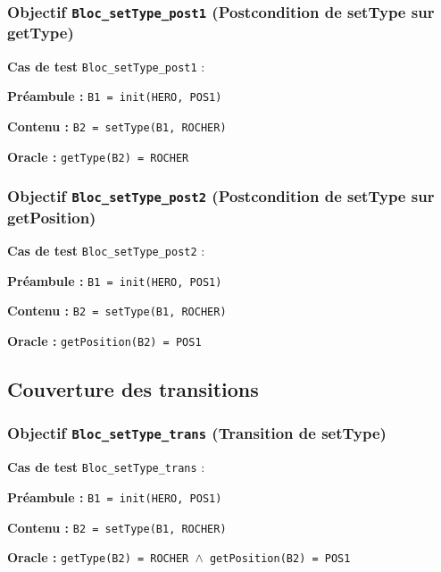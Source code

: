 \documentclass{article}
\newcommand{\cmd}[1]{\texttt{#1}}
\newcommand{\lAND}{$\land$}
\newcommand{\obj}[2]{\subsubsection*{\large{\textbf{Objectif {\cmd{#1} (#2)}}}}}
\newenvironment{cas}[1]
{
	\hspace{1em}\textbf{Cas de test} \cmd{#1} :
	\begin{list}{}{}
}{
	\end{list}
}
\newcommand{\pre}[1]{\item \textbf{Préambule :} \cmd{#1}}
\newcommand{\ope}[1]{\item \textbf{Contenu :} \cmd{#1}}
\newcommand{\ora}[1]{\item \textbf{Oracle :} \cmd{#1}}
\begin{document}
\obj{Bloc\_setType\_post1} {Postcondition de setType sur getType}
	\begin{cas}{Bloc\_setType\_post1}
		\pre{B1 = init(HERO, POS1)}
		\ope{B2 = setType(B1, ROCHER)}
		\ora{getType(B2) = ROCHER}
	\end{cas}


\obj{Bloc\_setType\_post2} {Postcondition de setType sur getPosition}
	\begin{cas}{Bloc\_setType\_post2}
		\pre{B1 = init(HERO, POS1)}
		\ope{B2 = setType(B1, ROCHER)}
		\ora{getPosition(B2) = POS1}
	\end{cas}


\subsection{Couverture des transitions}

\obj{Bloc\_setType\_trans} {Transition de setType}
	\begin{cas}{Bloc\_setType\_trans}
		\pre{B1 = init(HERO, POS1)}
		\ope{B2 = setType(B1, ROCHER)}
		\ora{getType(B2) = ROCHER \lAND{} getPosition(B2) = POS1}
	\end{cas}
\end{document}

